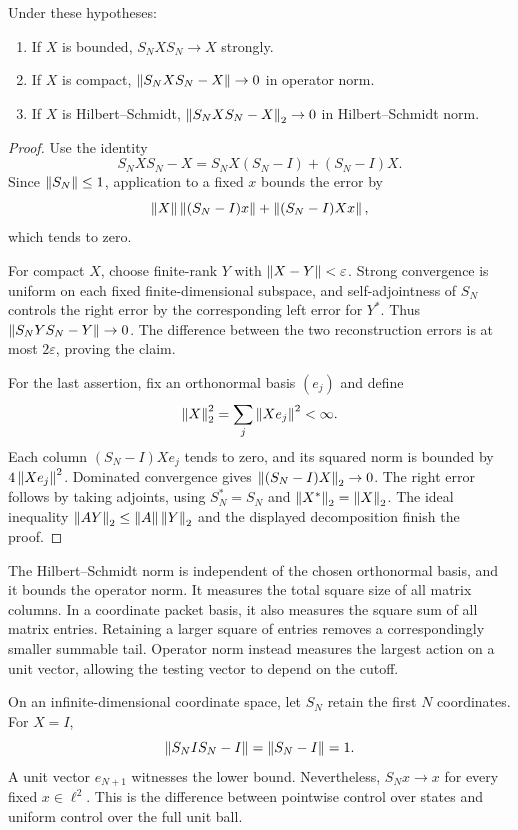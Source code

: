\begin{theorem}
Under these hypotheses:
\begin{enumerate}
\item If $X$ is bounded, $S_NXS_N\to X$ strongly.
\item If $X$ is compact, $\left\lVert S_NXS_N-X\right\rVert\to0$ in operator norm.
\item If $X$ is Hilbert--Schmidt, $\left\lVert S_NXS_N-X\right\rVert_2\to0$ in Hilbert--Schmidt norm.
\end{enumerate}
\end{theorem}
\begin{proof}
Use the identity
\[
 S_NXS_N-X=S_NX(S_N-I)+(S_N-I)X.
\]
Since $\left\lVert S_N\right\rVert\leq1$, application to a fixed $x$ bounds the error by
\[
 \left\lVert X\right\rVert\left\lVert(S_N-I)x\right\rVert+\left\lVert(S_N-I)Xx\right\rVert,
\]
which tends to zero.

For compact $X$, choose finite-rank $Y$ with $\left\lVert X-Y\right\rVert<\varepsilon$. Strong convergence is uniform on each fixed finite-dimensional subspace, and self-adjointness of $S_N$ controls the right error by the corresponding left error for $Y^*$. Thus $\left\lVert S_NYS_N-Y\right\rVert\to0$. The difference between the two reconstruction errors is at most $2\varepsilon$, proving the claim.

For the last assertion, fix an orthonormal basis $(e_j)$ and define
\[
 \left\lVert X\right\rVert_2^2=\sum_j\left\lVert Xe_j\right\rVert^2<\infty.
\]
Each column $(S_N-I)Xe_j$ tends to zero, and its squared norm is bounded by $4\left\lVert Xe_j\right\rVert^2$. Dominated convergence gives $\left\lVert(S_N-I)X\right\rVert_2\to0$. The right error follows by taking adjoints, using $S_N^*=S_N$ and $\left\lVert X^*\right\rVert_2=\left\lVert X\right\rVert_2$. The ideal inequality $\left\lVert AY\right\rVert_2\leq\left\lVert A\right\rVert\left\lVert Y\right\rVert_2$ and the displayed decomposition finish the proof.
\end{proof}

The Hilbert--Schmidt norm is independent of the chosen orthonormal basis, and it bounds the operator norm. It measures the total square size of all matrix columns. In a coordinate packet basis, it also measures the square sum of all matrix entries. Retaining a larger square of entries removes a correspondingly smaller summable tail. Operator norm instead measures the largest action on a unit vector, allowing the testing vector to depend on the cutoff.

\begin{example}
On an infinite-dimensional coordinate space, let $S_N$ retain the first $N$ coordinates. For $X=I$,
\[
 \left\lVert S_NIS_N-I\right\rVert=\left\lVert S_N-I\right\rVert=1.
\]
A unit vector $e_{N+1}$ witnesses the lower bound. Nevertheless, $S_Nx\to x$ for every fixed $x\in\ell^2$. This is the difference between pointwise control over states and uniform control over the full unit ball.
\end{example}

